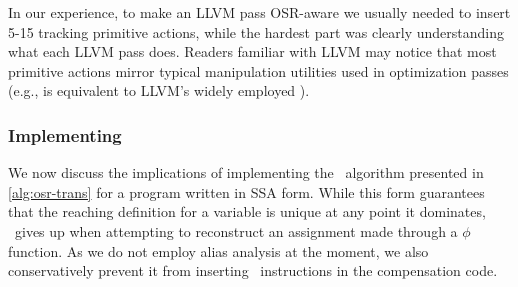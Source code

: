 In our experience, to make an LLVM pass OSR-aware we usually needed to insert 5-15 tracking primitive actions, while the hardest part was clearly understanding what each LLVM pass does. Readers familiar with LLVM may notice that most primitive actions mirror typical manipulation utilities used in optimization passes (e.g.,  is equivalent to LLVM's widely employed ).

\subsubsection*{Implementing }

We now discuss the implications of implementing the \buildcomp\ algorithm presented in \myalgorithm\ref{alg:osr-trans}
for a program written in SSA form. While this form guarantees that the reaching definition for a variable is unique at any point it dominates, \reconstruct\ gives up when attempting to reconstruct an assignment made through a $\phi$ function. As we do not employ alias analysis at the moment, we also conservatively prevent it from inserting \load\ instructions in the compensation code.

